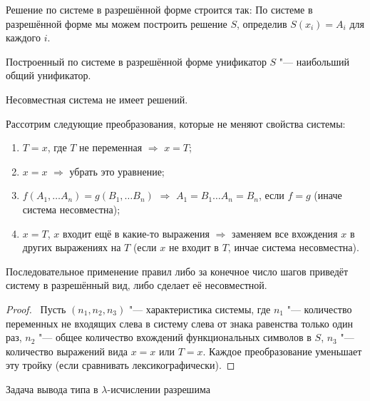 Решение по системе в разрешённой форме строится так:
По системе в разрешённой форме мы можем построить решение $S$, определив $S(x_i) = A_i$ для каждого $i$.
\todo

\begin{statement}
    Построенный по системе в разрешённой форме унификатор $S$ "--- наибольший общий унификатор.
\end{statement}

\begin{statement}
    Несовместная система не имеет решений.
\end{statement}

Рассотрим следующие преобразования, которые не меняют свойства системы:
\begin{enumerate}[label=(\asbuk*)]
    \item $T=x$, где $T$ не переменная $\Rightarrow$ $x=T$;
    \item $x=x$ $\Rightarrow$ убрать это уравнение;
    \item $f(A_1, \ldots A_n) = g(B_1, \ldots B_n)$ $\Rightarrow$ $ A_1 = B_1 \ldots A_n = B_n$, если $f = g$ (иначе система несовместна);
    \item $x=T$, $x$ входит ещё в какие-то выражения $\Rightarrow$ заменяем все вхождения $x$ в других выражениях на $T$
        (если $x$ не входит в $T$, инчае система несовместна).
\end{enumerate}

\begin{statement}
    Последовательное применение правил либо за конечное число шагов приведёт систему в разрешённый вид, либо сделает её несовместной.
\end{statement}

\begin{proof} \todo\ 
    Пусть $(n_1, n_2, n_3)$ "--- характеристика системы, где
    $n_1$ "--- количество переменных не входящих слева в систему слева от знака равенства только один раз,
    $n_2$ "--- общее количество вхождений функциональных символов в $S$,
    $n_3$ "--- количество выражений вида $x=x$ или $T=x$.
    Каждое преобразование уменьшает эту тройку (если сравнивать лексикографически).
\end{proof}

\begin{theorem}
    Задача вывода типа в $\lambda$-исчислении разрешима
\end{theorem}

